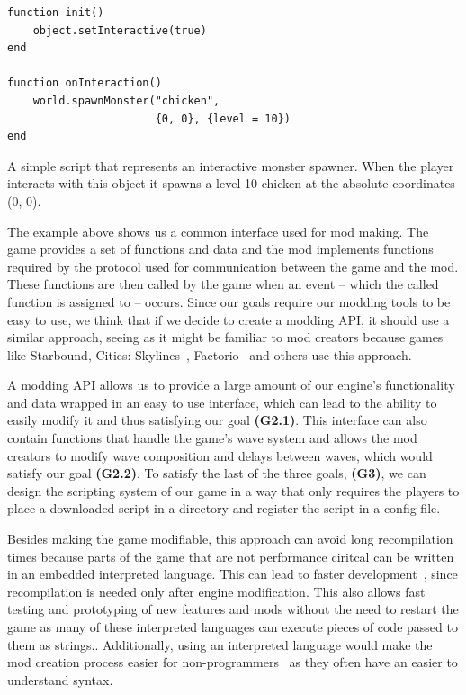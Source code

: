 \begin{listing}[H]
    \centering
    \begin{lstlisting}
function init()
    object.setInteractive(true)
end

function onInteraction()
    world.spawnMonster("chicken",
                       {0, 0}, {level = 10})
end
    \end{lstlisting}
    \caption{A simple script that represents an interactive monster spawner. When the player interacts
            with this object it spawns a level 10 chicken at the absolute coordinates (0, 0).}
    \label{sb-lua-mod-ex}
\end{listing}

The example above shows us a common interface used for mod making. The game provides a set of functions and data and the mod implements
functions required by the protocol used for communication between the game and the mod. These functions are then called by the game
when an event -- which the called function is assigned to -- occurs. Since our goals require our modding tools to be easy to use,
we think that if we decide to create a modding API, it should use a similar approach, seeing as it might be familiar to mod
creators because games like Starbound, Cities: Skylines~\cite{Skylines}, Factorio~\cite{Factorio} and others use this approach.

A modding API allows us to provide a large amount of our engine's functionality and data wrapped in an easy to use interface, which can lead
to the ability to easily modify it and thus satisfying our goal \textbf{(G2.1)}. This interface can also contain functions that handle the
game's wave system and allows the mod creators to modify wave composition and delays between waves, which would satisfy our goal
\textbf{(G2.2)}. To satisfy the last of the three goals, \textbf{(G3)}, we can design the scripting system of our game in a way that only
requires the players to place a downloaded script in a directory and register the script in a config file.

Besides making the game modifiable, this approach can avoid long recompilation times because parts of the game that are not performance
ciritcal can be written in an embedded interpreted language. This can lead to faster development~\cite{GEA}, since recompilation is
needed only after engine modification. This also allows fast testing and prototyping of new features and mods without the need
to restart the game as many of these interpreted languages can execute pieces of code passed to them as strings..
Additionally, using an interpreted language would make the mod creation process easier for non-programmers~\cite{WhyScripting} as
they often have an easier to understand syntax.

